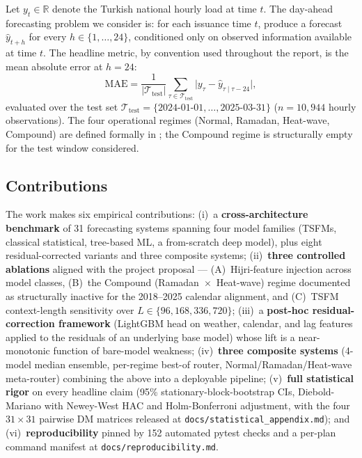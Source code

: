 \documentclass[10pt, a4paper, twocolumn]{article}
\begin{document}
Let $y_t \in \mathbb{R}$ denote the Turkish national hourly load at
time $t$. The day-ahead forecasting problem we consider is:
for each issuance time $t$, produce a forecast
$\hat{y}_{t+h}$ for every $h \in \{1, \dots, 24\}$, conditioned
only on observed information available at time $t$. The headline
metric, by convention used throughout the report, is the mean
absolute error at $h = 24$:
\begin{equation}
  \mathrm{MAE} = \frac{1}{|\mathcal{T}_{\mathrm{test}}|}
    \sum_{\tau \in \mathcal{T}_{\mathrm{test}}}
    \bigl| y_{\tau} - \hat{y}_{\tau \mid \tau - 24} \bigr|,
\end{equation}
evaluated over the test set
$\mathcal{T}_{\mathrm{test}} = \{2024\text{-}01\text{-}01,
\dots, 2025\text{-}03\text{-}31\}$
($n = 10{,}944$ hourly observations).
The four operational regimes (Normal, Ramadan, Heat-wave,
Compound) are defined formally in ; the
Compound regime is structurally empty for the test window
considered.

\subsection{Contributions}

The work makes six empirical contributions: (i)~a
\textbf{cross-architecture benchmark} of 31 forecasting systems
spanning four model families (TSFMs, classical statistical,
tree-based ML, a from-scratch deep model), plus eight
residual-corrected variants and three composite systems;
(ii)~\textbf{three controlled ablations} aligned with the project
proposal --- (A)~Hijri-feature injection across model classes,
(B)~the Compound (Ramadan~$\times$~Heat-wave) regime documented
as structurally inactive for the 2018--2025 calendar alignment,
and (C)~TSFM context-length sensitivity over $L \in \{96, 168,
336, 720\}$; (iii)~a \textbf{post-hoc residual-correction
framework} (LightGBM head on weather, calendar, and lag features
applied to the residuals of an underlying base model) whose lift
is a near-monotonic function of bare-model weakness;
(iv)~\textbf{three composite systems} (4-model median ensemble,
per-regime best-of router, Normal/Ramadan/Heat-wave meta-router)
combining the above into a deployable pipeline;
(v)~\textbf{full statistical rigor} on every headline claim
(95\% stationary-block-bootstrap CIs, Diebold-Mariano with
Newey-West HAC and Holm-Bonferroni adjustment, with the four
$31 \times 31$ pairwise DM matrices released at
\texttt{docs/statistical\_appendix.md}); and
(vi)~\textbf{reproducibility} pinned by 152 automated pytest
checks and a per-plan command manifest at
\texttt{docs/reproducibility.md}.
\end{document}
